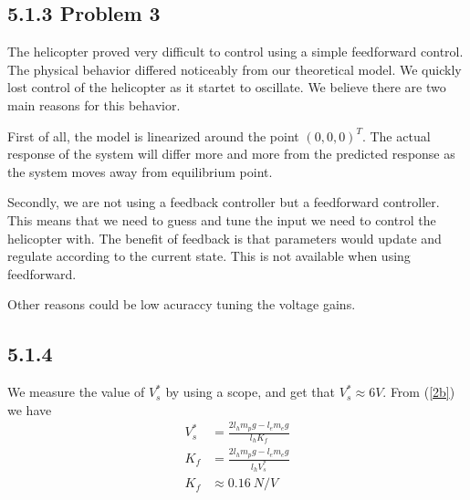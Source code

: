 \subsection*{5.1.3 Problem 3}
The helicopter proved very difficult to control using a simple feedforward control. The physical behavior differed noticeably from our theoretical model. We quickly lost control of the helicopter as it startet to oscillate. We believe there are two main reasons for this behavior. 

First of all, the model is linearized around the point $(0, 0, 0)^T$. The actual response of the system will differ more and more from the predicted response as the system moves away from equilibrium point.

Secondly, we are not using a feedback controller but a feedforward controller. This means that we need to guess and tune the input we need to control the helicopter with. The benefit of feedback is that parameters would update and regulate according to the current state. This is not available when using feedforward. 

Other reasons could be low acuraccy tuning the voltage gains. 

\subsection*{5.1.4}
We measure the value of $V_s^{\ast}$ by using a scope, and get that $V_s^{\ast} \approx 6V$. From (\ref{2b}) we have
\begin{align*}
    V_s^{\ast}  &= \frac{2l_hm_pg-l_em_eg}{l_hK_f}\\
    K_f         &= \frac{2l_hm_pg-l_em_eg}{l_hV_s^{\ast}}\\
    K_f         &\approx 0.16\ N/V
\end{align*}



